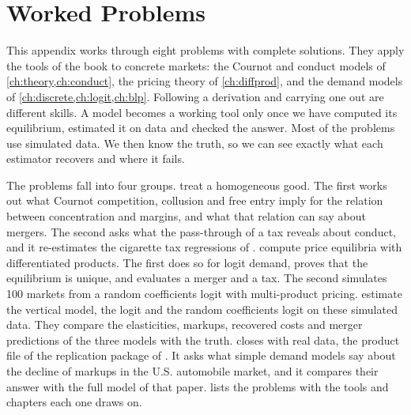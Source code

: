 \chapter{Worked Problems}\label{app:problems}

This appendix works through eight problems with complete solutions. They apply the tools of the book to concrete
markets: the Cournot and conduct models of \cref{ch:theory,ch:conduct}, the pricing theory of \cref{ch:diffprod},
and the demand models of \cref{ch:discrete,ch:logit,ch:blp}. Following a derivation and carrying one out are
different skills. A model becomes a working tool only once we have computed its equilibrium, estimated it on data
and checked the answer. Most of the problems use simulated data. We then know the truth, so we can see exactly what
each estimator recovers and where it fails.

The problems fall into four groups.  treat a homogeneous good. The first works
out what Cournot competition, collusion and free entry imply for the relation between concentration and margins,
and what that relation can say about mergers. The second asks what the pass-through of a tax reveals about conduct,
and it re-estimates the cigarette tax regressions of \citet{Sumner1981}. 
compute price equilibria with differentiated products. The first does so for logit demand, proves that the
equilibrium is unique, and evaluates a merger and a tax. The second simulates 100 markets from a random coefficients
logit with multi-product pricing.  estimate the vertical model,
the logit and the random coefficients logit on these simulated data. They compare the elasticities, markups,
recovered costs and merger predictions of the three models with the truth.  closes with real data,
the product file of the replication package of \citet{GriecoMurryYurukoglu2024}. It asks what simple demand models
say about the decline of markups in the U.S. automobile market, and it compares their answer with the full model of
that paper.  lists the problems with the tools
and chapters each one draws on.

